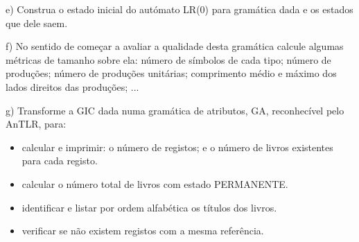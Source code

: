 e) Construa o estado inicial do autómato LR(0) para gramática dada e os estados que dele saem.

f) No sentido de começar a avaliar a qualidade desta gramática calcule algumas métricas de tamanho
sobre ela: número de símbolos de cada tipo; número de produções; número de produções unitárias;
comprimento médio e máximo dos lados direitos das produções; ...

g) Transforme a GIC dada numa gramática de atributos, GA, reconhecível pelo AnTLR, para:
\begin{itemize}
\item calcular e imprimir: o número de registos; e o número de livros existentes para cada registo.
\item calcular o número total de livros com estado PERMANENTE.
\item identificar e listar por ordem alfabética os títulos dos livros.
\item verificar se não existem registos com a mesma referência.
\end{itemize}

\newpage
